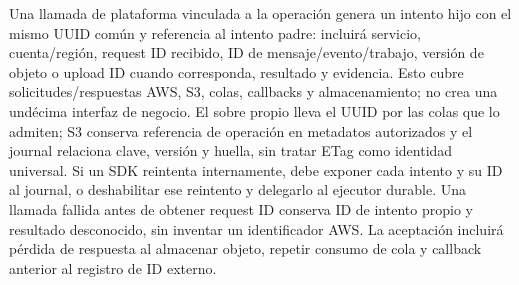 Una llamada de plataforma vinculada a la operación genera un intento hijo con el mismo UUID común y referencia al intento padre: incluirá servicio, cuenta/región, request ID recibido, ID de mensaje/evento/trabajo, versión de objeto o upload ID cuando corresponda, resultado y evidencia. Esto cubre solicitudes/respuestas AWS, S3, colas, callbacks y almacenamiento; no crea una undécima interfaz de negocio. El sobre propio lleva el UUID por las colas que lo admiten; S3 conserva referencia de operación en metadatos autorizados y el journal relaciona clave, versión y huella, sin tratar ETag como identidad universal. Si un SDK reintenta internamente, debe exponer cada intento y su ID al journal, o deshabilitar ese reintento y delegarlo al ejecutor durable. Una llamada fallida antes de obtener request ID conserva ID de intento propio y resultado desconocido, sin inventar un identificador AWS. La aceptación incluirá pérdida de respuesta al almacenar objeto, repetir consumo de cola y callback anterior al registro de ID externo.

